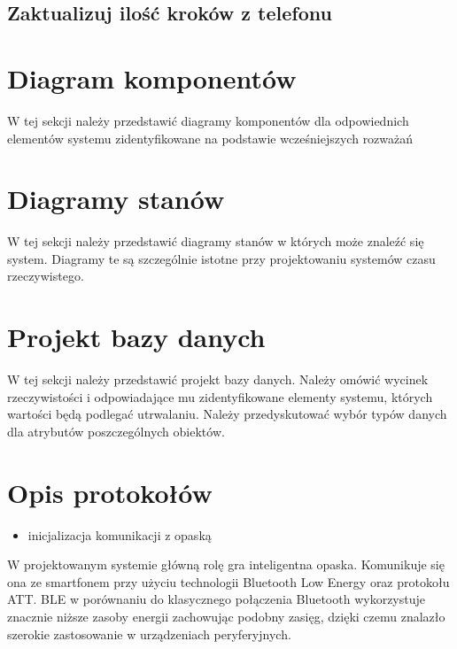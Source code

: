 \subsection{Zaktualizuj ilość kroków z telefonu}

\section{Diagram komponentów}

W tej sekcji należy przedstawić diagramy komponentów dla odpowiednich elementów systemu zidentyfikowane na podstawie wcześniejszych rozważań

\section{Diagramy stanów}

W tej sekcji należy przedstawić diagramy stanów w których może znaleźć się system. Diagramy te są szczególnie istotne przy projektowaniu systemów czasu rzeczywistego.

\section{Projekt bazy danych}

W tej sekcji należy przedstawić projekt bazy danych. Należy omówić wycinek rzeczywistości i odpowiadające mu zidentyfikowane elementy systemu, których wartości będą podlegać utrwalaniu. Należy przedyskutować wybór typów danych dla atrybutów poszczególnych obiektów.  

\section{Opis protokołów}
\begin{itemize}
    \item inicjalizacja komunikacji z opaską
\end{itemize}

W projektowanym systemie główną rolę gra inteligentna opaska. Komunikuje się ona ze smartfonem przy użyciu technologii Bluetooth Low Energy oraz protokołu ATT. BLE w porównaniu
do klasycznego połączenia Bluetooth wykorzystuje znacznie niższe zasoby energii zachowując podobny zasięg, dzięki czemu znalazło
szerokie zastosowanie w urządzeniach peryferyjnych.
